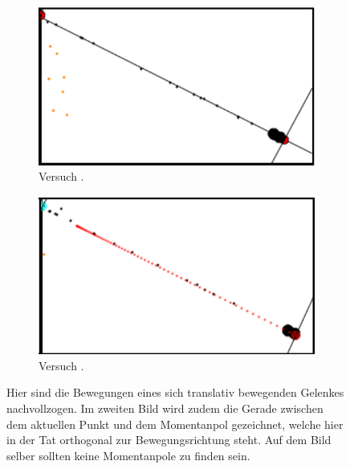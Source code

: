 \begin{figure}
    \centering
    \begin{subfigure}[t]{0.45\textwidth}
        \includegraphics[width=\textwidth]{gfx/translatives_glied_1.png}
        \caption{Versuch .}\label{fig:translatives_glied_1}
    \end{subfigure}
    \begin{subfigure}[t]{0.45\textwidth}
        \includegraphics[width=\textwidth]{gfx/translatives_glied_3.png}
        \caption{Versuch .}\label{fig:translatives_glied_3}
    \end{subfigure}
    \caption[Versuche  und ]{Hier sind die Bewegungen eines sich translativ bewegenden Gelenkes nachvollzogen. Im zweiten Bild wird zudem die Gerade zwischen dem aktuellen Punkt und dem Momentanpol gezeichnet, welche hier in der Tat orthogonal zur Bewegungsrichtung steht. Auf dem Bild selber sollten keine Momentanpole zu finden sein.}
    \label{fig:translatives_glied_1_3}
\end{figure}

